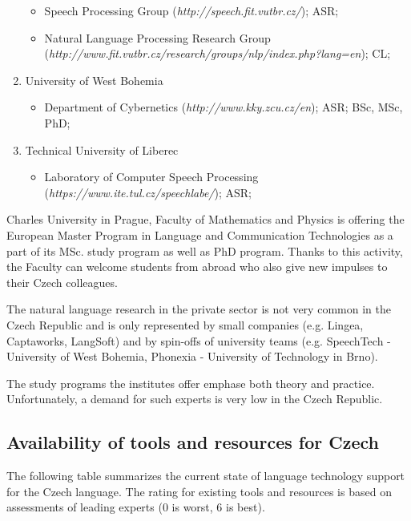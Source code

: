 \begin{multicols}{2}
\begin{enumerate}
\begin{itemize}
  \item Speech Processing Group (\textit{http://speech.fit.vutbr.cz/}); ASR; 
  \end{itemize}
  \begin{itemize}
  \item Natural Language Processing Research Group (\textit{http://www.fit.vutbr.cz/research/groups/nlp/index.php?lang=en}); CL; 
  \end{itemize}
\item University of West Bohemia
  \begin{itemize}
  \item Department of Cybernetics (\textit{http://www.kky.zcu.cz/en}); ASR; BSc, MSc, PhD;
  \end{itemize}
\item Technical University of Liberec
  \begin{itemize}
  \item Laboratory of Computer Speech Processing (\textit{https://www.ite.tul.cz/speechlabe/}); ASR; 
  \end{itemize}
\end{enumerate}

Charles University in Prague, Faculty of Mathematics and Physics is offering the European Master Program in Language and Communication Technologies as a part of its MSc. study program as well as PhD program. Thanks to this activity, the Faculty can welcome students from abroad who also give new impulses to their Czech colleagues.

The natural language research in the private sector is not very common in the Czech Republic and is only represented by small companies (e.g. Lingea, Captaworks, LangSoft) and by spin-offs of university teams (e.g. SpeechTech - University of West Bohemia, Phonexia - University of Technology in Brno).

The study programs the institutes offer emphase both theory and practice. Unfortunately, a demand for such experts is very low in the Czech Republic.

\subsection{Availability of tools and resources for Czech}
The following table summarizes the current state of language technology support for the Czech language. The rating for existing tools and resources is based on assessments of leading experts (0 is worst, 6 is best).


\end{multicols}
